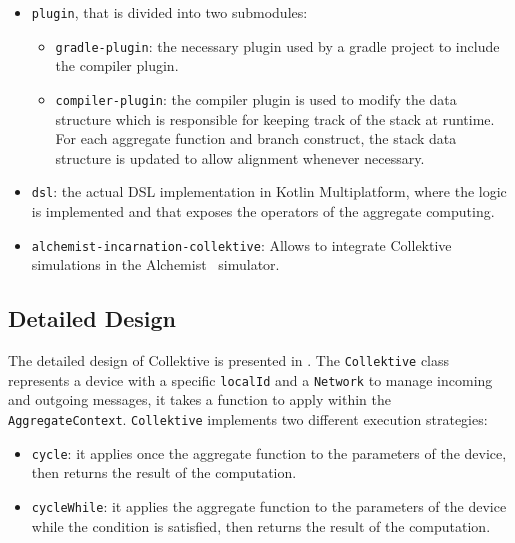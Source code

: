 \begin{itemize}
    \item \texttt{plugin}, that is divided into two submodules:
          \begin{itemize}
              \item \texttt{gradle-plugin}: the necessary plugin used by a gradle project to include the compiler plugin.
              \item \texttt{compiler-plugin}: the compiler plugin is used to modify the data structure which is responsible for keeping track of the stack at runtime. For each aggregate function and branch construct, the stack data structure is updated to allow alignment whenever necessary.
          \end{itemize}
    \item \texttt{dsl}: the actual DSL implementation in Kotlin Multiplatform, where the logic is implemented and that exposes the operators of the aggregate computing.
    \item \texttt{alchemist-incarnation-collektive}: Allows to integrate Collektive simulations in the Alchemist~\cite{Pianini2013} simulator.
\end{itemize}

\subsection{Detailed Design}

The detailed design of Collektive is presented in . The \texttt{Collektive} class represents a device with a specific \texttt{localId} and a \texttt{Network} to manage incoming and outgoing messages, it takes a function to apply within the \texttt{AggregateContext}. \texttt{Collektive} implements two different execution strategies:

\begin{itemize}
    \item \texttt{cycle}: it applies once the aggregate function to the parameters of the device, then returns the result of the computation.
    \item \texttt{cycleWhile}: it applies the aggregate function to the parameters of the device while the condition is satisfied, then returns the result of the computation.
\end{itemize}

